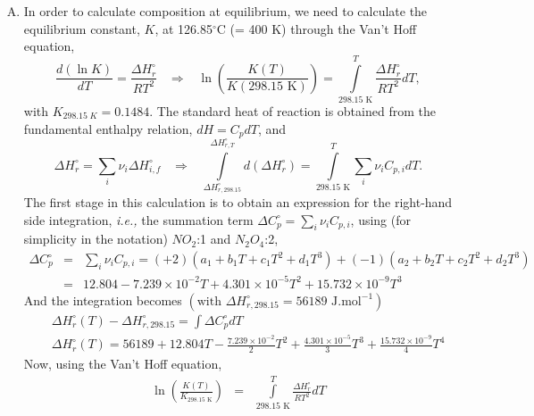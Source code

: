 \documentclass[calculator,allquestions,datasheet,mock,solutions]{exam_newMarcus2}
\newcommand{\frc}{\displaystyle\frac}
\newcommand{\ie}{{\it i.e., }}
\newcommand{\summation}[3][error]{\sum\limits_{#2}^{#3}#1}
\begin{document}
\begin{question}
\begin{enumerate}[a)]
{\begin{enumerate}[A.]
        \item In order to calculate composition at equilibrium, we need to calculate the equilibrium constant, $K$, at 126.85$^{\circ}$C (= 400 K) through the Van't Hoff equation,
\begin{displaymath}
    \frc{d\left(\ln{K}\right)}{dT} = \frc{\Delta H^{\circ}_{r}}{RT^{2}} \;\;\;\Longrightarrow \;\;\; \ln{\left(\frc{K(T)}{K(298.15\text{ K})}\right)} = \int\limits_{298.15\text{ K}}^{T}\frc{\Delta H^{\circ}_{r}}{RT^{2}}dT,
\end{displaymath}
with $K_{298.15\;K}=0.1484$. The standard heat of reaction is obtained from the fundamental enthalpy relation, $dH= C_{p}dT$, and~
\begin{displaymath}
     \Delta H^{\circ}_{r} = \summation[\nu_{i}\Delta H^{\circ}_{i,f}]{i}{} \;\;\;\Longrightarrow\;\;\; \int\limits_{\Delta H^{\circ}_{r,298.15}}^{\Delta H^{\circ}_{r,T}}d\left(\Delta H^{\circ}_{r}\right) = \int\limits_{298.15\text{ K}}^{T}\summation[\nu_{i} C_{p,i}]{i}{}dT.
\end{displaymath}
The first stage in this calculation is to obtain an expression for the right-hand side integration, \ie the summation term $\Delta C_{p}^{\circ} = \summation[\nu_{i} C_{p,i}]{i}{}$, using (for simplicity in the notation) $NO_{2}$:1 and $N_{2}O_{4}$:2,
\begin{eqnarray}
   \Delta C_{p}^{\circ} &=& \summation[\nu_{i} C_{p,i}]{i}{} = (+2) \left(a_{1}+b_{1}T+c_{1}T^{2}+d_{1}T^{3}\right) + (-1)\left(a_{2}+b_{2}T+c_{2}T^{2}+d_{2}T^{3}\right) \nonumber \\
                     &=& 12.804 - 7.239\times 10^{-2}T + 4.301\times 10^{-5} T^{2} + 15.732\times 10^{-9}T^{3} \nonumber 
\end{eqnarray}
And the integration becomes $\left(\text{with }\Delta H^{\circ}_{r,298.15} = 56189\text{ J.mol}^{-1}\right)$~
\begin{eqnarray}
    && \Delta H^{\circ}_{r}(T) - \Delta H^{\circ}_{r,298.15} = \int\Delta C_{p}^{\circ}dT \nonumber \\
    && \Delta H^{\circ}_{r}(T) = 56189 + 12.804 T - \frc{7.239\times 10^{-2}}{2}T^{2} + \frc{4.301\times 10^{-5}}{3}T^{3} + \frc{15.732\times 10^{-9}}{4}T^{4} \nonumber
\end{eqnarray}
Now, using the Van't Hoff equation,~
\begin{eqnarray}
  \ln{\left(\frc{K(T)}{K_{298.15\text{ K}}}\right)} &=& \int\limits_{298.15\text{ K}}^{T}\frc{\Delta H^{\circ}_{r}}{RT^{2}}dT \nonumber \\

\end{eqnarray}
\end{enumerate}}
\end{enumerate}
\end{question}
\end{document}
